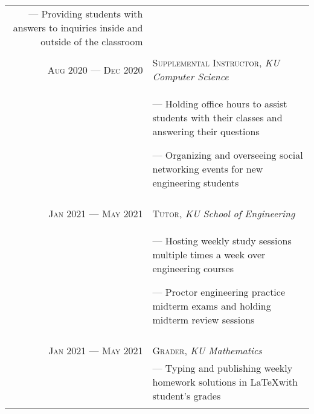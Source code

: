 \documentclass[a4paper, 10pt]{article}
\begin{document}
\begin{tabular}{r|p{12cm}}
{		--- Providing students with answers to inquiries inside and outside of the classroom
	}                                                                                                                            \\\multicolumn{2}{c}{}\\


	\textsc{Aug 2020 --- Dec 2020} & \textsc{Supplemental Instructor}, \emph{KU Computer Science}                                \\&\footnotesize{
		--- Holding office hours to assist students with their classes and answering their questions

		--- Organizing and overseeing social networking events for new engineering students
	}                                                                                                                            \\\multicolumn{2}{c}{}\\

	\textsc{Jan 2021 --- May 2021} & \textsc{Tutor}, \emph{KU School of Engineering}                                             \\&\footnotesize{
		--- Hosting weekly study sessions multiple times a week over engineering courses

		--- Proctor engineering practice midterm exams and holding midterm review sessions
	}                                                                                                                            \\\multicolumn{2}{c}{}\\

	\textsc{Jan 2021 --- May 2021} & \textsc{Grader}, \emph{KU Mathematics}                                                      \\&\footnotesize{
		--- Typing and publishing weekly homework solutions in \LaTeX with student's grades
	}                                                                                                                            \\\multicolumn{2}{c}{}\\
\end{tabular}
\end{document}
